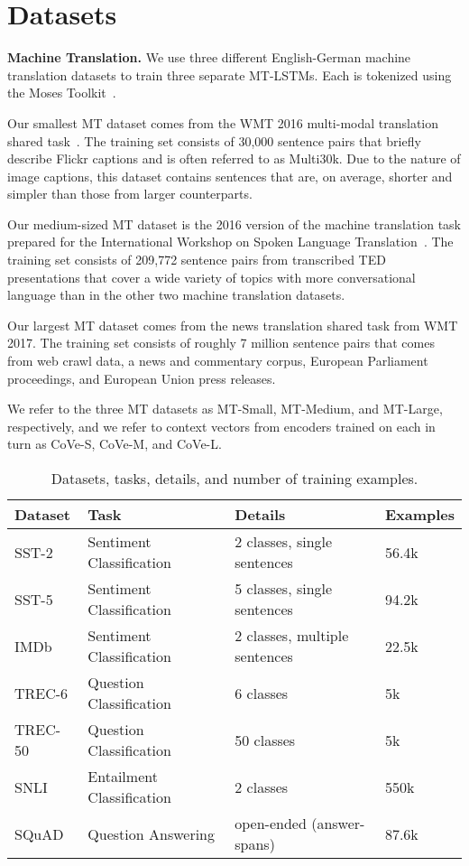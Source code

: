 \section{Datasets}

\textbf{Machine Translation.} 
We use three different English-German machine translation datasets to train three separate MT-LSTMs. 
Each is tokenized using the Moses Toolkit~\citep{Koehn2007}.

Our smallest MT dataset comes from the WMT 2016 multi-modal translation shared task~\citep{Specia2016}.
The training set consists of 30,000 sentence pairs that briefly describe Flickr captions and is often referred to as Multi30k.
Due to the nature of image captions, this dataset contains sentences that are, on average, shorter and simpler than those from larger counterparts.

Our medium-sized MT dataset is the 2016 version of the machine translation task prepared for the International Workshop on Spoken Language Translation~\citep{cettolo2015iwslt}. 
The training set consists of 209,772 sentence pairs from transcribed TED presentations that cover a wide variety of topics with more conversational language than in the other two machine translation datasets.

Our largest MT dataset comes from the news translation shared task from WMT 2017.
The training set consists of roughly 7 million sentence pairs that comes from web crawl data, a news and commentary corpus, European Parliament proceedings, and European Union press releases.

We refer to the three MT datasets as MT-Small, MT-Medium, and MT-Large, respectively,
and we refer to context vectors from encoders trained on each in turn as CoVe-S, CoVe-M, and CoVe-L.
\bigskip

\begin{table}
  \centering
\begin{tabular}{llll}
    \toprule
Dataset & Task & Details & Examples\\
\midrule
 SST-2   &Sentiment Classification & 2 classes, single sentences        & 56.4k\\
 SST-5   & Sentiment Classification & 5 classes, single sentences           &94.2k \\
 IMDb    & Sentiment Classification & 2 classes, multiple sentences          &22.5k   \\
TREC-6  & Question Classification& 6 classes & 5k  \\
  TREC-50 & Question Classification& 50 classes &5k  \\
SNLI    &Entailment Classification &  2 classes        &  550k \\
SQuAD & Question Answering & open-ended (answer-spans)  & 87.6k  \\
\bottomrule
  \end{tabular}
      \caption{Datasets, tasks, details, and number of training examples.}
      \vspace{-0.6cm}
  \label{tasks}
\end{table}


